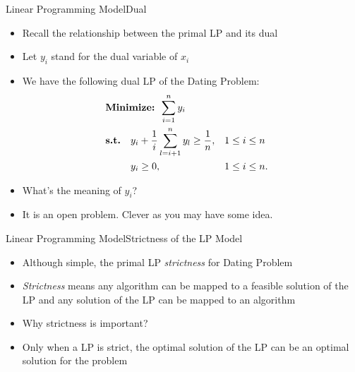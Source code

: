 \documentclass{beamer}
\begin{document}
\begin{frame}{Linear Programming Model}{Dual}
\begin{itemize}
  \item Recall the relationship between the primal LP and its dual 
  \item Let $y_i$ stand for the dual variable of $x_i$
  \item We have the following dual LP of the Dating Problem:  
		\begin{equation}
				\begin{split}
						&\text{\bf Minimize: } \sum_{i=1}^n y_i\\
						&\begin{aligned}
								&\text{\bf s.t.}& & y_i +\frac{1}{i}\sum_{l = i+1}^{n} y_l\geq \frac{1}{n}, & &1\leq i \leq n&\\
								& & &y_i \geq 0, & &1\leq i \leq n.&
						\end{aligned}
				\end{split}
		\end{equation}
  \item What's the meaning of $y_i$? 
  \item It is an open problem. Clever as you may have some idea. 
\end{itemize}
\end{frame}

\begin{frame}{Linear Programming Model}{Strictness of the LP Model}
\begin{itemize}
    \item Although simple, the primal LP \emph{strictness} for Dating Problem
	\item \emph{Strictness} means any algorithm can be mapped to a feasible solution of the LP and any solution of the LP can be mapped to an algorithm
	\item Why strictness is important?
	\item Only when a LP is strict, the optimal solution of the LP can be an optimal solution for the problem
\end{itemize}
\end{frame}
\end{document}
